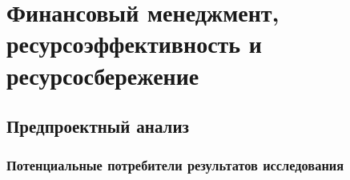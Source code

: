 \section{Финансовый менеджмент, \\ресурсоэффективность и ресурсосбережение}
\label{section:financial}






\subsection{Предпроектный анализ}

\subsubsection{Потенциальные потребители результатов исследования}

